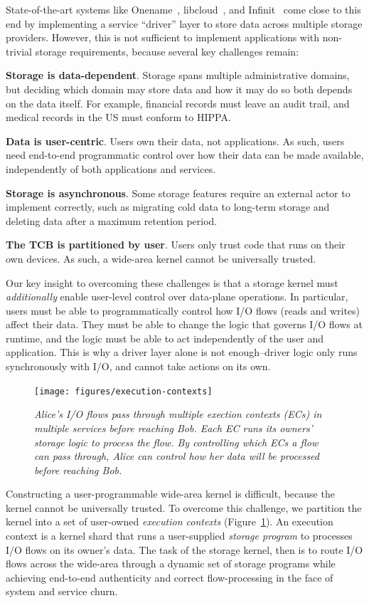 State-of-the-art systems like Onename~\cite{onename},
libcloud~\cite{libcloud}, and Infinit~\cite{infinit} come close to this
end by implementing a service ``driver'' layer to
store data across multiple storage providers.  However, this is not
sufficient to implement applications with non-trivial storage requirements,
because several key challenges remain:

\textbf{Storage is data-dependent}. Storage spans multiple
administrative domains, but deciding which domain may store data and how it may
do so both depends on the data itself. For example, financial records must leave
an audit trail, and medical records in the US must conform to HIPPA.

\textbf{Data is user-centric}. Users own their data, not applications.
As such, users need end-to-end programmatic control over how their data
can be made available, independently of both applications and services.

\textbf{Storage is asynchronous}. Some storage features require an external
actor to implement correctly, such as migrating cold data to long-term storage
and deleting data after a maximum retention period.

\textbf{The TCB is partitioned by user}.  Users only trust code that runs on their own
devices.  As such, a wide-area kernel cannot be universally trusted.

Our key insight to overcoming these challenges is that a storage kernel
must \textit{additionally} enable user-level control over data-plane operations.
In particular, users must be able to programmatically
control how I/O flows (reads and writes) affect their data.  They must be able to change the
logic that governs I/O flows at runtime, and the logic must be able to
act independently of the user and application.  This is why a driver layer alone is
not enough--driver logic only runs synchronously with I/O, and cannot take
actions on its own.

\begin{figure}[t!]
\centering
\texttt{[image: figures/execution-contexts]}
\caption{\it Alice's I/O flows pass through
   multiple exection contexts (ECs) in multiple services before reaching Bob.  Each
   EC runs its owners' storage logic to process the flow.  By
   controlling which ECs a flow can pass through, Alice can control how her data
   will be processed before reaching Bob.}
\label{fig:execution-contexts}
\end{figure}

Constructing a user-programmable wide-area kernel is difficult, because the kernel cannot be
universally trusted.  To overcome this challenge, we partition the kernel into a
set of user-owned \textit{execution contexts}
(Figure~\ref{fig:execution-contexts}).  An execution context is a
kernel shard that runs a user-supplied \textit{storage program} to processes I/O
flows on its owner's data.  The task of the storage kernel, then is to 
route I/O flows across the wide-area 
through a dynamic set of storage programs
while achieving end-to-end authenticity and correct flow-processing in the face
of system and service churn.

